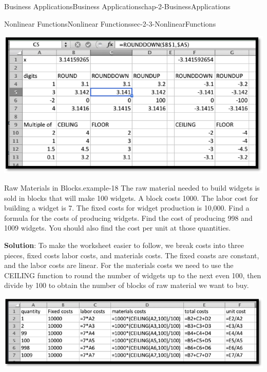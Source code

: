 \documentclass[oneside,10pt,]{book}
\newcommand{\terminology}[1]{\textbf{#1}}
\numberwithin{equation}{section}
\begin{document}
\begin{chapterptx}{Business Applications}{}{Business Applications}{}{}{chap-2-BusinessApplications}
\begin{sectionptx}{Nonlinear Functions}{}{Nonlinear Functions}{}{}{sec-2-3-NonlinearFunctions}
\begin{sidebyside}{1}{0.1}{0.1}{0}%
\begin{sbspanel}{0.8}%
\includegraphics[width=1\linewidth]{images/sec2-3-4.png}
\end{sbspanel}%
\end{sidebyside}%
\begin{example}{Raw Materials in Blocks.}{example-18}%
\hypertarget{p-785}{}%
The raw material needed to build widgets is sold in blocks that will make 100 widgets.  A block costs \textdollar{}1000.  The labor cost for building a widget is \textdollar{}7.  The fixed costs for widget production is \textdollar{}10,000.  Find a formula for the costs of producing widgets.  Find the cost of producing 998 and 1009 widgets.  You should also find the cost per unit at those quantities.%
\par
\hypertarget{p-786}{}%
\terminology{Solution}:  To make the worksheet easier to follow, we break costs into three pieces, fixed costs labor costs, and materials costs.  The fixed coasts are constant, and the labor costs are linear.  For the materials costs we need to use the CEILING function to round the number of widgets up to the next even 100, then divide by 100 to obtain the number of blocks of raw material we want to buy.%
\begin{sidebyside}{1}{0.1}{0.1}{0}%
\begin{sbspanel}{0.8}%
\includegraphics[width=1\linewidth]{images/sec2-3-5.png}
\end{sbspanel}%

\end{sidebyside}
\end{example}
\end{sectionptx}
\end{chapterptx}
\end{document}
